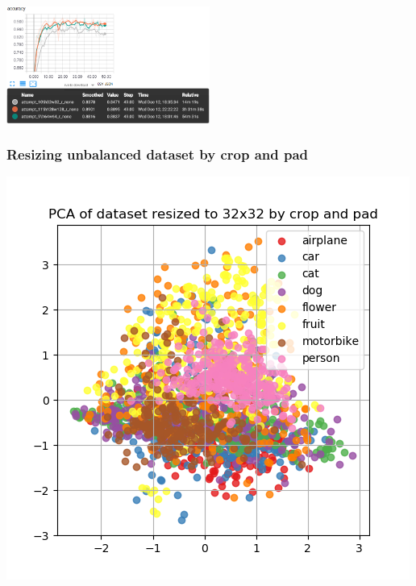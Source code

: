\documentclass{article}
\begin{document}
\begin{minipage}[c]{\textwidth}
	\includegraphics[width=0.5\textwidth]{./figures/acc_r_none.png}
\end{minipage}

\begin{minipage}[c]{\linewidth}
	\subsubsection{Resizing unbalanced dataset by crop and pad}
	\centering
	\includegraphics[width= \figureWidth\textwidth]{./figures/pca_h32_w32_cp_none.png}

\end{minipage}
\end{document}
